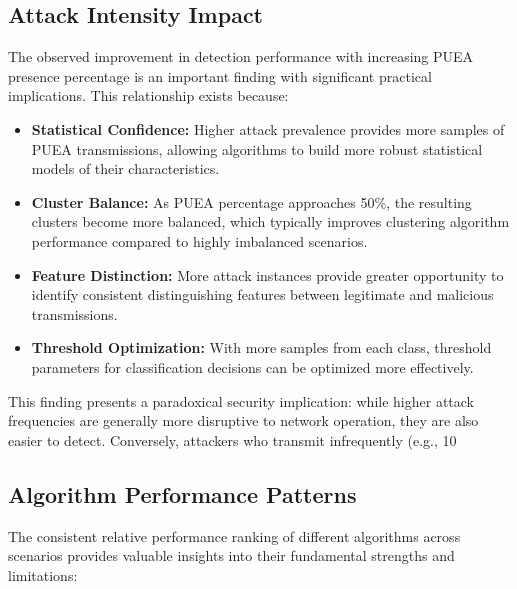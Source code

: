 \subsection{Attack Intensity Impact}

The observed improvement in detection performance with increasing PUEA presence percentage is an important finding with significant practical implications. This relationship exists because:

\begin{itemize}
    \item \textbf{Statistical Confidence:} Higher attack prevalence provides more samples of PUEA transmissions, allowing algorithms to build more robust statistical models of their characteristics.
    
    \item \textbf{Cluster Balance:} As PUEA percentage approaches 50\%, the resulting clusters become more balanced, which typically improves clustering algorithm performance compared to highly imbalanced scenarios.
    
    \item \textbf{Feature Distinction:} More attack instances provide greater opportunity to identify consistent distinguishing features between legitimate and malicious transmissions.
    
    \item \textbf{Threshold Optimization:} With more samples from each class, threshold parameters for classification decisions can be optimized more effectively.
\end{itemize}

This finding presents a paradoxical security implication: while higher attack frequencies are generally more disruptive to network operation, they are also easier to detect. Conversely, attackers who transmit infrequently (e.g., 10%

\subsection{Algorithm Performance Patterns}

The consistent relative performance ranking of different algorithms across scenarios provides valuable insights into their fundamental strengths and limitations:

